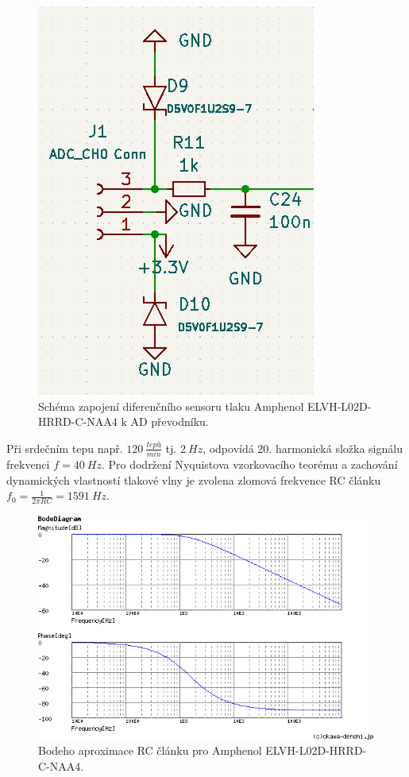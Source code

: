 \begin{figure}[H]
    \centering
    \includegraphics[width=0.7\linewidth]{pictures/diff_sen_circuit.jpg}
    \caption{Schéma zapojení diferenčního sensoru tlaku Amphenol ELVH-L02D-HRRD-C-NAA4 k AD převodníku.}
    \label{fig:amphenol_circuit}
\end{figure}

Při srdečním tepu např. $120 \  \frac{tepů}{min}$ tj. $2 \ Hz$, odpovídá 20. harmonická složka signálu frekvenci  $f = 40 \ Hz$. Pro dodržení Nyquistova vzorkovacího teorému a zachování dynamických vlastností tlakové vlny je zvolena zlomová frekvence RC článku $f_0 = \frac{1}{2 \pi RC} = 1591 \ Hz $.

\begin{figure}[H]
    \centering
    \includegraphics[width=0.9\linewidth]{pictures/rc_1k_100n_1591.png}
    \caption{Bodeho aproximace RC článku pro Amphenol ELVH-L02D-HRRD-C-NAA4. \cite{cite:RCResponse}}
    \label{fig:amphenol_filter}
\end{figure}

